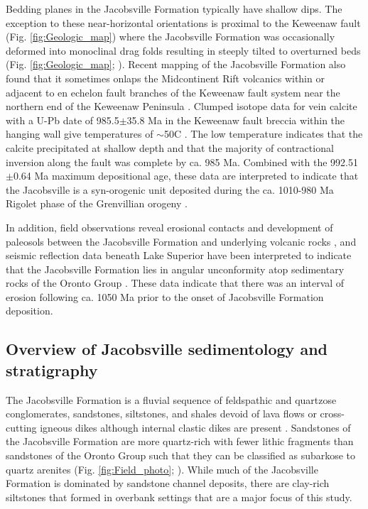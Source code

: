 \documentclass[draft]{agujournal2019}
\begin{document}
Bedding planes in the Jacobsville Formation typically have shallow dips. The exception to these near-horizontal orientations is proximal to the Keweenaw fault (Fig. \ref{fig:Geologic_map}) where the Jacobsville Formation was occasionally deformed into monoclinal drag folds resulting in steeply tilted to overturned beds (Fig. \ref{fig:Geologic_map}; ). Recent mapping of the Jacobsville Formation also found that it sometimes onlaps the Midcontinent Rift volcanics within or adjacent to en echelon fault branches of the Keweenaw fault system near the northern end of the Keweenaw Peninsula \cite{Tyrrell2019a, Mueller2021a}. Clumped isotope data for vein calcite with a U-Pb date of 985.5$\pm$35.8 Ma in the Keweenaw fault breccia within the hanging wall give temperatures of $\sim$50\textdegree C  \cite{Hodgin2022a}. The low temperature indicates that the calcite precipitated at shallow depth and that the majority of contractional inversion along the fault was complete by ca. 985 Ma. Combined with the 992.51$\pm$0.64 Ma maximum depositional age, these data are interpreted to indicate that the Jacobsville is a syn-orogenic unit deposited during the ca. 1010-980 Ma Rigolet phase of the Grenvillian orogeny \cite{Hodgin2022a, Swanson-Hysell2023a}. 

In addition, field observations reveal erosional contacts and development of paleosols between the Jacobsville Formation and underlying volcanic rocks \cite{Hamblin1958a, Kalliokoski1975a}, and seismic reflection data beneath Lake Superior have been interpreted to indicate that the Jacobsville Formation lies in angular unconformity atop sedimentary rocks of the Oronto Group \cite{Cannon1989a}. These data indicate that there was an interval of erosion following ca. 1050 Ma prior to the onset of Jacobsville Formation deposition. 

\subsection*{Overview of Jacobsville sedimentology and stratigraphy}

The Jacobsville Formation is a fluvial sequence of feldspathic and quartzose conglomerates, sandstones, siltstones, and shales devoid of lava flows or cross-cutting igneous dikes although internal clastic dikes are present \cite{Hamblin1958a}. Sandstones of the Jacobsville Formation are more quartz-rich with fewer lithic fragments than sandstones of the Oronto Group such that they can be classified as subarkose to quartz arenites (Fig. \ref{fig:Field_photo}; ). While much of the Jacobsville Formation is dominated by sandstone channel deposits, there are clay-rich siltstones that formed in overbank settings that are a major focus of this study.
\end{document}
